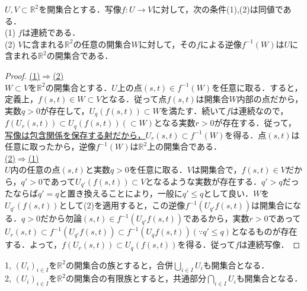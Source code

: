 \documentclass[uplatex, 12pt, a4paper, dvipdfmx]{jsarticle}
\begin{document}
\begin{shadebox}\begin{definition}[連続写像の特徴付け]
    $U,V\subset\mathbb{R}^2$を開集合とする．写像$f:U\longrightarrow V$に対して，次の条件(1),(2)は同値である．\\
    (1) $f$は連続である．\\
    (2) $V$に含まれる$\mathbb{R}^2$の任意の開集合$W$に対して，その$f$による逆像$f^{-1}(W)$は$U$に含まれる$\mathbb{R}^2$の開集合である．
\end{definition}\end{shadebox}

\begin{proof}
    \underline{(1)$\Longrightarrow$(2)}\\
    $W\subset V$を$\mathbb{R}^2$の開集合とする．$U$上の点$(s,t)\in f^{-1}(W)$を任意に取る．すると，定義上，$f(s,t)\in W\subset V$となる．従って点$f(s,t)$は開集合$W$内部の点だから，実数$q>0$が存在して，$U_q(f(s,t))\subset W$を満たす．続いて$f$は連続なので，$f(U_r(s,t))\subset U_q(f(s,t))(\subset W)$となる実数$r>0$が存在する．従って，\underline{写像は包含関係を保存する射だから，}$U_r(s,t)\subset f^{-1}(W)$を得る．点$(s,t)$は任意に取ったから，逆像$f^{-1}(W)$は$\mathbb{R}^2$上の開集合である．\\
    \underline{(2)$\Longrightarrow$(1)}\\
    $U$内の任意の点$(s,t)$と実数$q>0$を任意に取る．$V$は開集合で，$f(s,t)\in V$だから，$q'>0$であって$U_{q'}(f(s,t))\subset V$となるような実数が存在する．$q'>q$だったならば$q'=q$と置き換えることにより，一般に$q'\le q$として良い．$W$を$U_{q'}(f(s,t))$として(2)を適用すると，この逆像$f^{-1}(U_{q'}f(s,t))$は開集合になる．$q>0$だから勿論$(s,t)\in f^{-1}(U_{q'}f(s,t))$であるから，実数$r>0$であって$U_r(s,t)\subset f^{-1}(U_{q'}f(s,t)) \subset f^{-1}(U_{q}f(s,t)) (\because q'\le q)$となるものが存在する．よって，$f(U_r(s,t))\subset U_q(f(s,t))$を得る．従って$f$は連続写像．
\end{proof}

\begin{shadebox}\begin{proposition}[Euclid空間の開集合の集合演算に対する性質]\label{proposition1}
    1, $(U_i)_{i\in I}$を$\mathbb{R}^2$の開集合の族とすると，合併$\bigcup_{i\in I}U_i$も開集合となる．\\
    2, $(U_i)_{i\in I}$を$\mathbb{R}^2$の開集合の有限族とすると，共通部分$\bigcap_{i\in I}U_i$も開集合となる．\\
\end{proposition}\end{shadebox}
\end{document}
